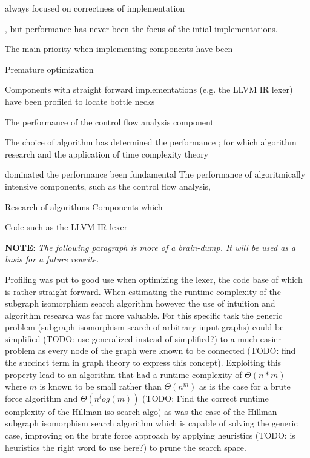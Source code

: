 always focused on correctness of implementation

, but performance has never been the focus of the intial implementations.

The main priority when implementing components have been

 Premature optimization









Components with straight forward implementations (e.g. the LLVM IR lexer) have been profiled to locate bottle necks

The performance of the control flow analysis component

The choice of algorithm has determined the performance ; for which algorithm research and the application of time complexity theory

dominated the performance  been fundamental The performance of algoritmically intensive components, such as the control flow analysis,



Research of algorithms Components which

Code such as the LLVM IR lexer





























\textbf{NOTE}: \textit{The following paragraph is more of a brain-dump. It will be used as a basis for a future rewrite.}

Profiling was put to good use when optimizing the lexer, the code base of which is rather straight forward. When estimating the runtime complexity of the subgraph isomorphism search algorithm however the use of intuition and algorithm research was far more valuable. For this specific task the generic problem (subgraph isomorphism search of arbitrary input graphs) could be simplified (TODO: use generalized instead of simplified?) to a much easier problem as every node of the graph were known to be connected (TODO: find the succinct term in graph theory to express this concept). Exploiting this property lead to an algorithm that had a runtime complexity of $ \Theta(n*m) $ where $ m $ is known to be small rather than $ \Theta(n^m) $ as is the case for a brute force algorithm and $ \Theta(n^log(m)) $ (TODO: Find the correct runtime complexity of the Hillman iso search algo) as was the case of the Hillman subgraph isomorphism search algorithm which is capable of solving the generic case, improving on the brute force approach by applying heuristics (TODO: is heuristics the right word to use here?) to prune the search space.

